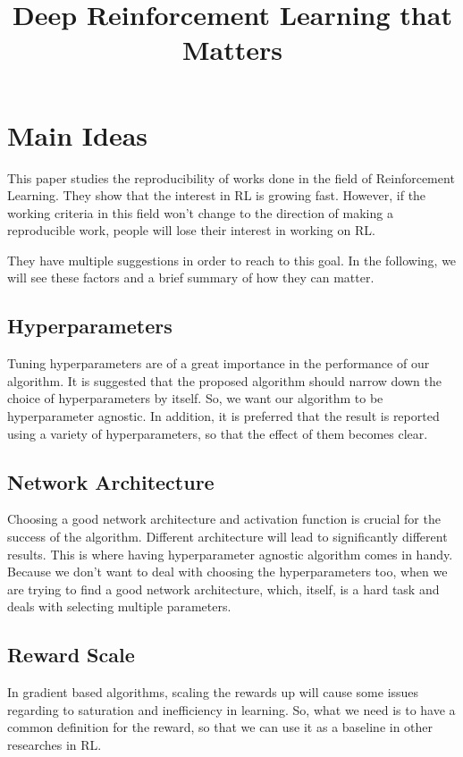 \documentclass{article}
\title{Deep Reinforcement Learning that Matters}
\date{}
\theoremstyle{remark}
\theoremstyle{remark}
\theoremstyle{remark}
\theoremstyle{remark}
\theoremstyle{remark}
\theoremstyle{remark}
\begin{document}
\maketitle
\section{Main Ideas}
This paper studies the reproducibility of works done in the field of Reinforcement Learning. They show that the interest in RL is growing fast. However, if the working criteria in this field won't change to the direction of making a reproducible work, people will lose their interest in working on RL.

They have multiple suggestions in order to reach to this goal. In the following, we will see these factors and a brief summary of how they can matter.

\subsection{Hyperparameters}
Tuning hyperparameters are of a great importance in the performance of our algorithm. It is suggested that the proposed algorithm should narrow down the choice of hyperparameters by itself. So, we want our algorithm to be hyperparameter agnostic. In addition, it is preferred that the result is reported using a variety of hyperparameters, so that the effect of them becomes clear.

\subsection{Network Architecture}
Choosing a good network architecture and activation function is crucial for the success of the algorithm. Different architecture will lead to significantly different results. This is where having hyperparameter agnostic algorithm comes in handy. Because we don't want to deal with choosing the hyperparameters too, when we are trying to find a good network architecture, which, itself, is a hard task and deals with selecting multiple parameters.

\subsection{Reward Scale}
In gradient based algorithms, scaling the rewards up will cause some issues regarding to saturation and inefficiency in learning. So, what we need is to have a common definition for the reward, so that we can use it as a baseline in other researches in RL.
\end{document}
